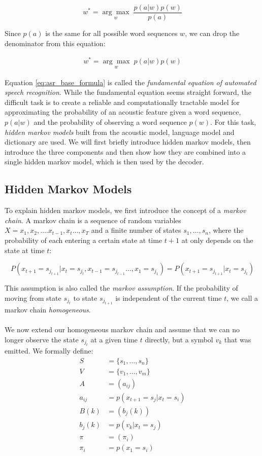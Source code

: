 \[
w^* = \underset{w}{\arg \max} \; \frac{p(a|w) p(w)}{p(a)}
\]

Since $p(a)$ is the same for all possible word sequences $w$, we can drop the denominator from this equation:

\begin{align}
w^* = \underset{w}{\arg \max} \; p(a|w) p(w)
\label{eq:asr_base_formula}
\end{align}

Equation \ref{eq:asr_base_formula} is called the \textit{fundamental equation of automated speech recognition}. While the fundamental equation seems straight forward, the difficult task is to create a reliable and computationally tractable model for approximating the probability of an acoustic feature given a word sequence, $p(a|w)$ and the probability of observing a word sequence $p(w)$. For this task, \textit{hidden markov models} built from the acoustic model, language model and dictionary are used. We will first briefly introduce hidden markov models, then introduce the three components and then show how they are combined into a single hidden markov model, which is then used by the decoder. 

\subsection{Hidden Markov Models}
To explain hidden markov models, we first introduce the concept of a \textit{markov chain}. A markov chain is a sequence of random variables $X = x_1, x_2, \dots. x_{t - 1}, x_{t} \dots, x_T$ and a finite number of states $s_1, \dots, s_n$, where the probability of each entering a certain state at time $t + 1$ at only depends on the state at time $t$:

\[
P(x_{t + 1} = s_{j_{t + 1}} | x_{t} = s_{j_t}, x_{t - 1} = s_{j_{t - 1}} \dots, x_{1} = s_{j_{1}}) = P(x_{t + 1} = s_{j_{t + 1}} | x_{t} = s_{j_t})
\] 

This assumption is also called the \textit{markov assumption}. If the probability of moving from state $s_{j_t}$ to state $s_{j_{t + 1}}$ is independent of the current time $t$, we call a markov chain \textit{homogeneous}. \\ \\
We now extend our homogeneous markov chain and assume that we can no longer observe the state $s_{j_t}$ at a given time $t$ directly, but a symbol $v_k$ that was emitted. We formally define: 
\begin{align*}
S &= \{s_1, \dots, s_n\} \tag{states} \\
V &= \{v_1, \dots, v_m\} \tag{symbols} \\
A &= (a_{ij}) \tag{state tansmission probability} \\
a_{ij} &= p(x_{t+1} = s_j | x_{t} = s_i) \\
B(k) &= (b_j(k)) \tag{emisson probability} \\
b_j(k) &= p(v_k | x_t = s_j) \\
\pi &= (\pi_i) \tag{initial state probability} \\
\pi_i &= p(x_1 = s_i)
\end{align*}

